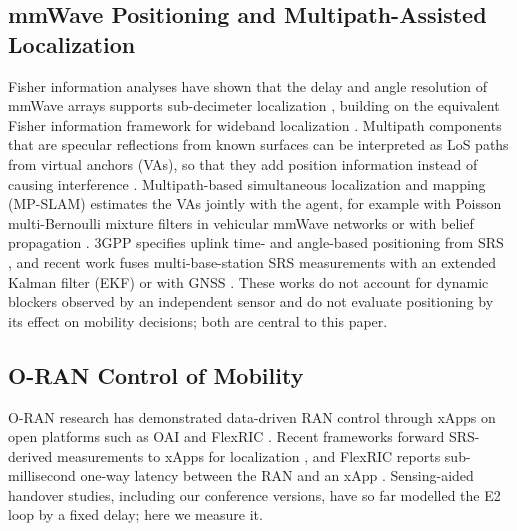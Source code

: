 \documentclass[journal]{IEEEtran}
\begin{document}
\subsection{mmWave Positioning and Multipath-Assisted Localization}
Fisher information analyses have shown that the delay and angle
resolution of mmWave arrays supports sub-decimeter localization
\cite{shahmansoori2018position,abushaban2018bounds}, building on the
equivalent Fisher information framework for wideband localization
\cite{shen2010fundamental}. Multipath components that are specular
reflections from known surfaces can be interpreted as LoS paths from
virtual anchors (VAs), so that they add position information instead of
causing interference \cite{leitinger2015evaluation,witrisal2016high}.
Multipath-based simultaneous localization and mapping (MP-SLAM) estimates
the VAs jointly with the agent, for example with Poisson multi-Bernoulli
mixture filters in vehicular mmWave networks \cite{kim2022pmbm} or with
belief propagation \cite{li2024bpslam,meyer2018message}. 3GPP specifies
uplink time- and angle-based positioning from SRS \cite{3gpp38855}, and
recent work fuses multi-base-station SRS measurements with an extended
Kalman filter (EKF) \cite{dong2026deployable} or with GNSS
\cite{campolo2024gnss}. These works do not account for dynamic blockers
observed by an independent sensor and do not evaluate positioning by its
effect on mobility decisions; both are central to this paper.

\subsection{O-RAN Control of Mobility}
O-RAN research has demonstrated data-driven RAN control through xApps
\cite{polese2023oran,bonati2021intelligence} on open platforms such as
OAI and FlexRIC \cite{nikaein2014oai,schmidt2021flexric}. Recent
frameworks forward SRS-derived measurements to xApps for localization
\cite{oran2025locframework}, and FlexRIC reports sub-millisecond one-way
latency between the RAN and an xApp \cite{oai2024innovation}. Sensing-aided
handover studies, including our conference versions, have so far modelled
the E2 loop by a fixed delay; \textcolor{propcol}{here we measure it}.
\end{document}
